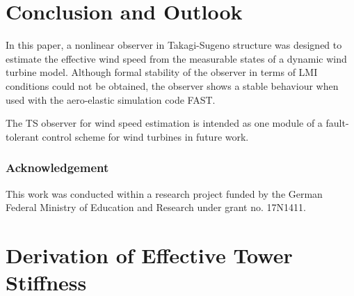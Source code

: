 \documentclass[a4paper]{article}
\begin{document}
\section{\label{Sec_Conclusion}Conclusion and Outlook}

In this paper, a nonlinear observer in Takagi-Sugeno structure was designed to estimate the effective wind speed from the measurable states of a dynamic wind turbine model. Although formal stability of the observer in terms of LMI conditions could not be obtained, the observer shows a stable behaviour when used with the aero-elastic simulation code FAST.

The TS observer for wind speed estimation is intended as one module of a fault-tolerant control scheme for wind turbines in future work.





\subsubsection*{Acknowledgement}

This work was conducted within a research project funded by the German Federal Ministry of Education and Research under grant no. 17N1411.

\appendix

\section{\label{Sec_AppDirectStiffness}Derivation of Effective Tower Stiffness}
\end{document}
